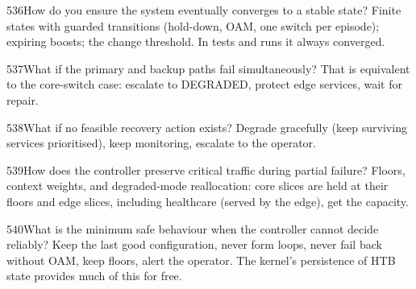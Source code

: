 \begin{qa}{536}{How do you ensure the system eventually converges to a stable state?}
Finite states with guarded transitions (hold-down, OAM, one switch per episode); expiring boosts; the change
threshold. In tests and runs it always converged.
\end{qa}

\begin{qa}{537}{What if the primary and backup paths fail simultaneously?}
That is equivalent to the core-switch case: escalate to \textsf{DEGRADED}, protect edge services, wait for repair.
\end{qa}

\begin{qa}{538}{What if no feasible recovery action exists?}
Degrade gracefully (keep surviving services prioritised), keep monitoring, escalate to the operator.
\end{qa}

\begin{qa}{539}{How does the controller preserve critical traffic during partial failure?}
Floors, context weights, and degraded-mode reallocation: core slices are held at their floors and edge slices,
including healthcare (served by the edge), get the capacity.
\end{qa}

\begin{qa}{540}{What is the minimum safe behaviour when the controller cannot decide reliably?}
Keep the last good configuration, never form loops, never fail back without OAM, keep floors, alert the operator.
The kernel's persistence of HTB state provides much of this for free.
\end{qa}
